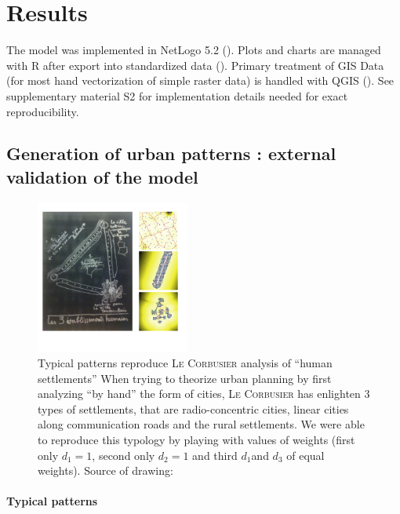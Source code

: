 \documentclass[a4paper,twocolumn,twoside,10pt]{article}
\newcommand{\noun}[1]{\textsc{#1}}
\begin{document}
\section{Results}

The model was implemented in NetLogo 5.2 (\cite{NetLogo}). Plots
and charts are managed with R after export into standardized data
(\cite{R}). Primary treatment of GIS Data (for most hand vectorization
of simple raster data) is handled with QGIS (\cite{QGIS_software}).
See supplementary material S2 for implementation details needed for
exact reproducibility.


\subsection{Generation of urban patterns : external validation of the model}



\begin{figure}[htp]
\centering
\includegraphics[trim=1cm 3cm 0.5cm 0cm,width=0.45\textwidth]{figures/corbu}
\caption{Typical patterns reproduce \noun{ Le Corbusier} analysis of ``human settlements'' When trying to theorize urban planning by first analyzing ``by hand''
the form of cities, \noun{ Le Corbusier}
has enlighten 3 types of settlements, that are radio-concentric cities,
linear cities along communication roads and the rural settlements.
We were able to reproduce this typology by playing with values of
weights (first only $d_{1}=1$, second only $d_{2}=1$ and third $d_{1}$and
$d_{3}$ of equal weights). Source of drawing: \cite{mangin2004ville} }

\label{fig2}

\end{figure}




\paragraph{Typical patterns}
\end{document}
